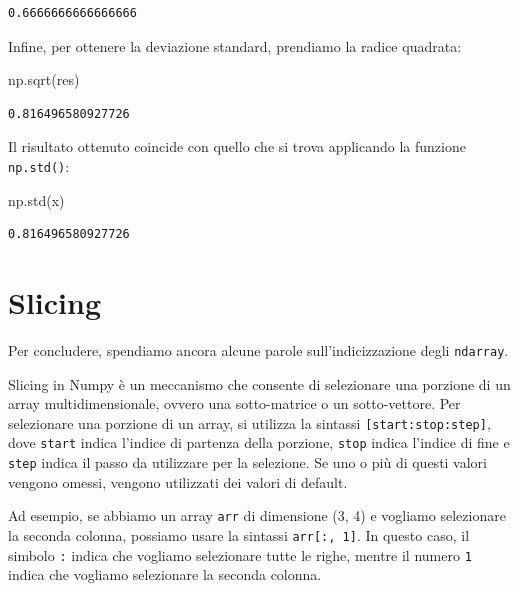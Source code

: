 \documentclass[
  letterpaper,
  krantz2]{{[}./krantz{]}}
\newenvironment{Shaded}{\begin{snugshade}}{\end{snugshade}}
\newcommand{\NormalTok}[1]{\textcolor[rgb]{0.00,0.23,0.31}{#1}}
\begin{document}
\begin{verbatim}
0.6666666666666666
\end{verbatim}

Infine, per ottenere la deviazione standard, prendiamo la radice
quadrata:

\begin{Shaded}
\begin{Highlighting}[]
\NormalTok{np.sqrt(res)}
\end{Highlighting}
\end{Shaded}

\begin{verbatim}
0.816496580927726
\end{verbatim}

Il risultato ottenuto coincide con quello che si trova applicando la
funzione \texttt{np.std()}:

\begin{Shaded}
\begin{Highlighting}[]
\NormalTok{np.std(x)}
\end{Highlighting}
\end{Shaded}

\begin{verbatim}
0.816496580927726
\end{verbatim}

\section{Slicing}\label{slicing}

Per concludere, spendiamo ancora alcune parole sull'indicizzazione degli
\texttt{ndarray}.

Slicing in Numpy è un meccanismo che consente di selezionare una
porzione di un array multidimensionale, ovvero una sotto-matrice o un
sotto-vettore. Per selezionare una porzione di un array, si utilizza la
sintassi \texttt{{[}start:stop:step{]}}, dove \texttt{start} indica
l'indice di partenza della porzione, \texttt{stop} indica l'indice di
fine e \texttt{step} indica il passo da utilizzare per la selezione. Se
uno o più di questi valori vengono omessi, vengono utilizzati dei valori
di default.

Ad esempio, se abbiamo un array \texttt{arr} di dimensione (3, 4) e
vogliamo selezionare la seconda colonna, possiamo usare la sintassi
\texttt{arr{[}:,\ 1{]}}. In questo caso, il simbolo \texttt{:} indica
che vogliamo selezionare tutte le righe, mentre il numero \texttt{1}
indica che vogliamo selezionare la seconda colonna.
\end{document}
